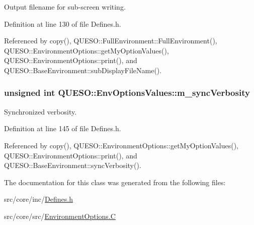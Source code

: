 Output filename for sub-\/screen writing. 



Definition at line 130 of file Defines.\-h.



Referenced by copy(), Q\-U\-E\-S\-O\-::\-Full\-Environment\-::\-Full\-Environment(), Q\-U\-E\-S\-O\-::\-Environment\-Options\-::get\-My\-Option\-Values(), Q\-U\-E\-S\-O\-::\-Environment\-Options\-::print(), and Q\-U\-E\-S\-O\-::\-Base\-Environment\-::sub\-Display\-File\-Name().

\hypertarget{class_q_u_e_s_o_1_1_env_options_values_a572ccae8dda30e5161c427d94d83fe34}{
\subsubsection[{m\-\_\-sync\-Verbosity}]{\setlength{\rightskip}{0pt plus 5cm}unsigned int Q\-U\-E\-S\-O\-::\-Env\-Options\-Values\-::m\-\_\-sync\-Verbosity}}\label{class_q_u_e_s_o_1_1_env_options_values_a572ccae8dda30e5161c427d94d83fe34}


Synchronized verbosity. 



Definition at line 145 of file Defines.\-h.



Referenced by copy(), Q\-U\-E\-S\-O\-::\-Environment\-Options\-::get\-My\-Option\-Values(), Q\-U\-E\-S\-O\-::\-Environment\-Options\-::print(), and Q\-U\-E\-S\-O\-::\-Base\-Environment\-::sync\-Verbosity().



The documentation for this class was generated from the following files\-:\begin{DoxyCompactItemize}
\item 
src/core/inc/\hyperlink{_defines_8h}{Defines.\-h}\item 
src/core/src/\hyperlink{_environment_options_8_c}{Environment\-Options.\-C}\end{DoxyCompactItemize}
